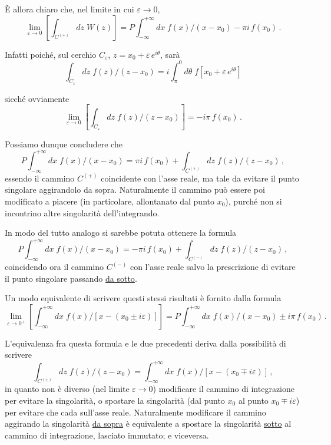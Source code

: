 \documentclass[11pt, a4paper]{book}
\numberwithin{equation}{section}
\begin{document}
È allora chiaro che, nel limite in cui $\varepsilon \to 0$,
\begin{equation}
\lim_{\varepsilon \to 0} \left[\int_{C^{(+)}} dz\; W(z)\right] = P\!\int_{-\infty}^{+\infty} dx\; f(x)/(x-x_0) - \pi i\, f(x_0)\,. \tag{4}
\end{equation}

Infatti poiché, sul cerchio $C_\varepsilon$, $z = x_0 + \varepsilon\,e^{i\theta}$, sarà
\[
\int_{C_\varepsilon} dz\; f(z)/(z-x_0) = i\int_{\pi}^{0} d\theta\; f\!\left[x_0 + \varepsilon\,e^{i\theta}\right]
\]

sicché ovviamente
\[
\lim_{\varepsilon \to 0} \left[\int_{C_\varepsilon} dz\; f(z)/(z-x_0)\right] = -i\pi\, f(x_0)\,.
\]

Possiamo dunque concludere che
\begin{equation}
P\!\int_{-\infty}^{+\infty} dx\; f(x)/(x-x_0) = \pi i\, f(x_0) + \int_{C^{(+)}} dz\; f(z)/(z-x_0)\,, \tag{5}
\end{equation}
essendo il cammino $C^{(+)}$ coincidente con l'asse reale, ma tale da evitare il punto singolare aggirando\-lo da sopra. Naturalmente il cammino può essere poi modificato a piacere (in particolare, allontanato dal punto $x_0$), purché non si incontrino altre singolarità dell'integrando.

In modo del tutto analogo si sarebbe potuta ottenere la formula
\begin{equation}
P\!\int_{-\infty}^{+\infty} dx\; f(x)/(x-x_0) = -\pi i\, f(x_0) + \int_{C^{(-)}} dz\; f(z)/(z-x_0)\,, \tag{6}
\end{equation}
coincidendo ora il cammino $C^{(-)}$ con l'asse reale salvo la prescrizione di evitare il punto singolare passando \underline{da sotto}.

Un modo equivalente di scrivere questi stessi risultati è fornito dalla formula
\begin{equation}
\lim_{\varepsilon \to 0^+} \left[\int_{-\infty}^{+\infty} dx\; f(x) \big/ \left[x - (x_0 \pm i\varepsilon)\right]\right] = P\!\int_{-\infty}^{+\infty} dx\; f(x)/(x-x_0) \pm i\pi\, f(x_0)\,. \tag{7}
\end{equation}

L'equivalenza fra questa formula e le due precedenti deriva dalla possibilità di scrivere
\[
\int_{C^{(\pm)}} dz\; f(z)/(z-x_0) = \int_{-\infty}^{+\infty} dx\; f(x) \big/ \left[x - (x_0 \mp i\varepsilon)\right]\,,
\]
in quanto non è diverso (nel limite $\varepsilon \to 0$) modificare il cammino di integrazione per evitare la singolarità, o spostare la singolarità (dal punto $x_0$ al punto $x_0 \mp i\varepsilon$) per evitare che cada sull'asse reale. Naturalmente modificare il cammino aggirando la singolarità \underline{da sopra} è equivalente a spostare la singolarità \underline{sotto} al cammino di integrazione, lasciato immutato; e viceversa.
\end{document}
